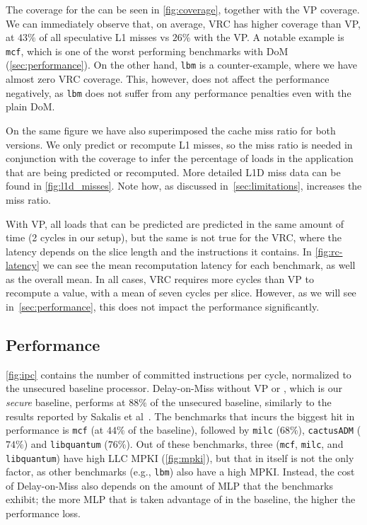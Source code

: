 The coverage for the {\recomp} can be seen in \autoref{fig:coverage}, together with the VP coverage. We can immediately observe that, on average, VRC has higher coverage than VP, at $43\%$ of all speculative L1 misses vs $26\%$ with the VP. A notable example is \texttt{mcf}, which is one of the worst performing benchmarks with DoM (\autoref{sec:performance}). On the other hand, \texttt{lbm} is a counter-example, where we have almost zero VRC coverage. This, however, does not affect the performance negatively, as \texttt{lbm} does not suffer from any performance penalties even with the plain DoM.

On the same figure we have also superimposed the cache miss ratio for both versions. We only predict or recompute L1 misses, so the miss ratio is needed in conjunction with the coverage to infer the percentage of loads in the application that are being predicted or recomputed. More detailed L1D miss data can be found in \autoref{fig:l1d_misses}. Note how, as discussed in~\autoref{sec:limitations}, \recomp{} increases the miss ratio.

With VP, all loads that can be predicted are predicted in the same amount of time (2 cycles in our setup), but the same is not true for the VRC, where the latency depends on the slice length and the instructions it contains. In \autoref{fig:rc-latency} we can see the mean recomputation latency for each benchmark, as well as the overall mean. In all cases, VRC requires more cycles than VP to recompute a value, with a mean of seven cycles per slice. However, as we will see in~\autoref{sec:performance}, this does not impact the performance significantly.

\subsection{Performance}
\label{sec:performance}

\autoref{fig:ipc} contains the number of committed instructions per cycle, normalized to the unsecured baseline processor. 
Delay-on-Miss without VP or \recomp, which is our \emph{secure} baseline, performs at $88\%$ of the unsecured baseline, similarly to the results reported by Sakalis et al~\cite{sakalis+:ISCA2019vp}. 
The benchmarks that incurs the biggest hit in performance is \texttt{mcf} (at $44\%$ of the baseline), followed by \texttt{milc} ($68\%$), \texttt{cactusADM} ($74\%$) and \texttt{libquantum} ($76\%$).
Out of these benchmarks, three (\texttt{mcf}, \texttt{milc}, and \texttt{libquantum}) have high LLC MPKI (\autoref{fig:mpki}), but that in itself is not the only factor, as other benchmarks (e.g., \texttt{lbm}) also have a high MPKI. 
Instead, the cost of Delay-on-Miss also depends on the amount of MLP that the benchmarks exhibit; the more MLP that is taken advantage of in the baseline, the higher the performance loss. 

